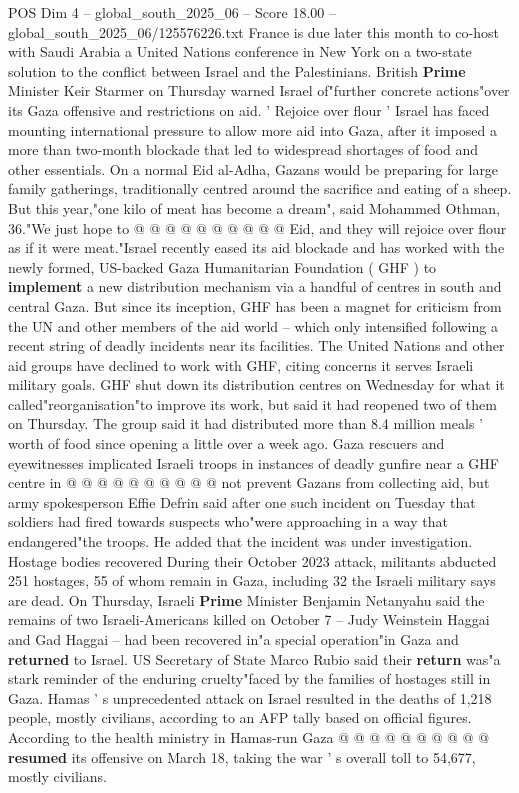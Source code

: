 \begin{textsample}{POS Dim 4 – global\_south\_2025\_06 – Score 18.00 – global\_south\_2025\_06/125576226.txt}
France is due later this month to co-host with Saudi Arabia a United Nations conference in New York on a two-state solution to the conflict between Israel and the Palestinians.
British \textbf{Prime} Minister Keir Starmer on Thursday warned Israel of"further concrete actions"over its Gaza offensive and restrictions on aid. ' Rejoice over flour ' Israel has faced mounting international pressure to allow more aid into Gaza, after it imposed a more than two-month blockade that led to widespread shortages of food and other essentials.
On a normal Eid al-Adha, Gazans would be preparing for large family gatherings, traditionally centred around the sacrifice and eating of a sheep.
But this year,"one kilo of meat has become a dream", said Mohammed Othman, 36."We just hope to @ @ @ @ @ @ @ @ @ @ Eid, and they will rejoice over flour as if it were meat."Israel recently eased its aid blockade and has worked with the newly formed, US-backed Gaza Humanitarian Foundation ( GHF ) to \textbf{implement} a new distribution mechanism via a handful of centres in south and central Gaza.
But since its inception, GHF has been a magnet for criticism from the UN and other members of the aid world -- which only intensified following a recent string of deadly incidents near its facilities.
The United Nations and other aid groups have declined to work with GHF, citing concerns it serves Israeli military goals.
GHF shut down its distribution centres on Wednesday for what it called"reorganisation"to improve its work, but said it had reopened two of them on Thursday.
The group said it had distributed more than 8.4 million meals ' worth of food since opening a little over a week ago.
Gaza rescuers and eyewitnesses implicated Israeli troops in instances of deadly gunfire near a GHF centre in @ @ @ @ @ @ @ @ @ @ not prevent Gazans from collecting aid, but army spokesperson Effie Defrin said after one such incident on Tuesday that soldiers had fired towards suspects who"were approaching in a way that endangered"the troops.
He added that the incident was under investigation.
Hostage bodies recovered During their October 2023 attack, militants abducted 251 hostages, 55 of whom remain in Gaza, including 32 the Israeli military says are dead.
On Thursday, Israeli \textbf{Prime} Minister Benjamin Netanyahu said the remains of two Israeli-Americans killed on October 7 -- Judy Weinstein Haggai and Gad Haggai -- had been recovered in"a special operation"in Gaza and \textbf{returned} to Israel.
US Secretary of State Marco Rubio said their \textbf{return} was"a stark reminder of the enduring cruelty"faced by the families of hostages still in Gaza.
Hamas ' s unprecedented attack on Israel resulted in the deaths of 1,218 people, mostly civilians, according to an AFP tally based on official figures.
According to the health ministry in Hamas-run Gaza @ @ @ @ @ @ @ @ @ @ \textbf{resumed} its offensive on March 18, taking the war ' s overall toll to 54,677, mostly civilians.

\end{textsample}
